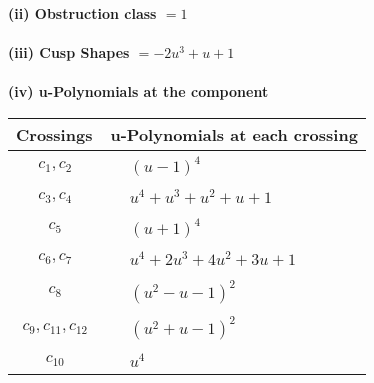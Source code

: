 \documentclass[1p]{elsarticle_modified}
\theoremstyle{definition}
\begin{document}
\flushleft \textbf{(ii) Obstruction class $= 1$}\\~\\
\flushleft \textbf{(iii) Cusp Shapes $= -2 u^3+u+1$}\\~\\
\newpage\renewcommand{\arraystretch}{1}
\flushleft \textbf{(iv) u-Polynomials at the component}\newline \\
\begin{tabular}{m{50pt}|m{274pt}}
Crossings & \hspace{64pt}u-Polynomials at each crossing \\
\hline $$\begin{aligned}c_{1},c_{2}\end{aligned}$$&$\begin{aligned}
&(u-1)^4
\end{aligned}$\\
\hline $$\begin{aligned}c_{3},c_{4}\end{aligned}$$&$\begin{aligned}
&u^4+u^3+u^2+u+1
\end{aligned}$\\
\hline $$\begin{aligned}c_{5}\end{aligned}$$&$\begin{aligned}
&(u+1)^4
\end{aligned}$\\
\hline $$\begin{aligned}c_{6},c_{7}\end{aligned}$$&$\begin{aligned}
&u^4+2 u^3+4 u^2+3 u+1
\end{aligned}$\\
\hline $$\begin{aligned}c_{8}\end{aligned}$$&$\begin{aligned}
&(u^2- u-1)^2
\end{aligned}$\\
\hline $$\begin{aligned}c_{9},c_{11},c_{12}\end{aligned}$$&$\begin{aligned}
&(u^2+u-1)^2
\end{aligned}$\\
\hline $$\begin{aligned}c_{10}\end{aligned}$$&$\begin{aligned}
&u^4
\end{aligned}$\\
\hline
\end{tabular}\\~\\
\end{document}
